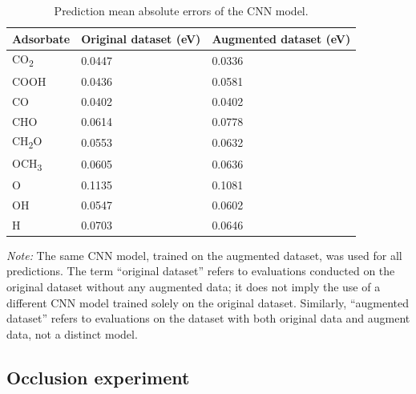 \documentclass[a4paper, 12pt]{article}
\begin{document}
\begin{table}[htbp]
\label{supp_table18:cnn_mae}
  \caption{Prediction mean absolute errors of the CNN model.}
  \small
  \center
  \begin{tabularx}{0.75\textwidth}{@{}lXX@{}}
    \toprule
    Adsorbate             & Original dataset (eV)  & Augmented dataset (eV)  \\
    \midrule
    CO\textsubscript{2}   & 0.0447                 & 0.0336                  \\
    COOH                  & 0.0436                 & 0.0581                  \\
    CO                    & 0.0402                 & 0.0402                  \\
    CHO                   & 0.0614                 & 0.0778                  \\
    CH\textsubscript{2}O  & 0.0553                 & 0.0632                  \\
    OCH\textsubscript{3}  & 0.0605                 & 0.0636                  \\
    O                     & 0.1135                 & 0.1081                  \\
    OH                    & 0.0547                 & 0.0602                  \\
    H                     & 0.0703                 & 0.0646                  \\
    \bottomrule
  \end{tabularx}

  \smallskip

  \begin{flushright}
  \begin{minipage}{\textwidth}
    \footnotesize\textit{Note:} The same CNN model, trained on the
      augmented dataset, was used for all predictions. The term ``original dataset''
      refers to evaluations conducted on the original dataset without any augmented data;
      it does not imply the use of a different CNN model trained solely on the original dataset.
      Similarly, ``augmented dataset'' refers to evaluations on the dataset with
      both original data and augment data, not a distinct model.
  \end{minipage}
  \end{flushright}
\end{table}

\subsection{Occlusion experiment}
\label{supp_sec3.5_occlusion}
\end{document}
